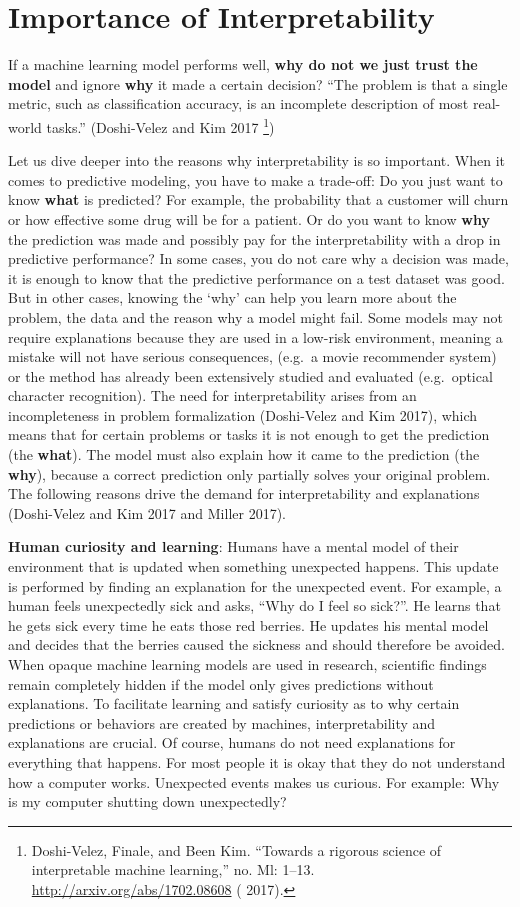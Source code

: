 \documentclass[12pt,]{krantz}
\begin{document}
\section{Importance of
Interpretability}\label{interpretability-importance}

If a machine learning model performs well, \textbf{why do not we just
trust the model} and ignore \textbf{why} it made a certain decision?
``The problem is that a single metric, such as classification accuracy,
is an incomplete description of most real-world tasks.'' (Doshi-Velez
and Kim 2017 \footnote{Doshi-Velez, Finale, and Been Kim. ``Towards a
  rigorous science of interpretable machine learning,'' no. Ml: 1--13.
  \url{http://arxiv.org/abs/1702.08608} ( 2017).})

Let us dive deeper into the reasons why interpretability is so
important. When it comes to predictive modeling, you have to make a
trade-off: Do you just want to know \textbf{what} is predicted? For
example, the probability that a customer will churn or how effective
some drug will be for a patient. Or do you want to know \textbf{why} the
prediction was made and possibly pay for the interpretability with a
drop in predictive performance? In some cases, you do not care why a
decision was made, it is enough to know that the predictive performance
on a test dataset was good. But in other cases, knowing the `why' can
help you learn more about the problem, the data and the reason why a
model might fail. Some models may not require explanations because they
are used in a low-risk environment, meaning a mistake will not have
serious consequences, (e.g.~a movie recommender system) or the method
has already been extensively studied and evaluated (e.g.~optical
character recognition). The need for interpretability arises from an
incompleteness in problem formalization (Doshi-Velez and Kim 2017),
which means that for certain problems or tasks it is not enough to get
the prediction (the \textbf{what}). The model must also explain how it
came to the prediction (the \textbf{why}), because a correct prediction
only partially solves your original problem. The following reasons drive
the demand for interpretability and explanations (Doshi-Velez and Kim
2017 and Miller 2017).

\textbf{Human curiosity and learning}: Humans have a mental model of
their environment that is updated when something unexpected happens.
This update is performed by finding an explanation for the unexpected
event. For example, a human feels unexpectedly sick and asks, ``Why do I
feel so sick?''. He learns that he gets sick every time he eats those
red berries. He updates his mental model and decides that the berries
caused the sickness and should therefore be avoided. When opaque machine
learning models are used in research, scientific findings remain
completely hidden if the model only gives predictions without
explanations. To facilitate learning and satisfy curiosity as to why
certain predictions or behaviors are created by machines,
interpretability and explanations are crucial. Of course, humans do not
need explanations for everything that happens. For most people it is
okay that they do not understand how a computer works. Unexpected events
makes us curious. For example: Why is my computer shutting down
unexpectedly?
\end{document}
